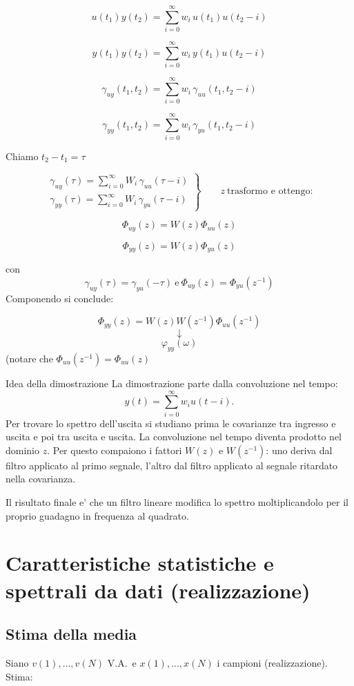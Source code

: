 \documentclass[11pt,a4paper]{article}
\begin{document}
\[
u(t_1)y(t_2)=\sum_{i=0}^{\infty}w_i\,u(t_1)u(t_2-i)
\]

\[
y(t_1)y(t_2)=\sum_{i=0}^{\infty}w_i\,y(t_1)u(t_2-i)
\]

\[
\gamma_{uy}(t_1,t_2)=\sum_{i=0}^{\infty}w_i\,\gamma_{uu}(t_1,t_2-i)
\]

\[
\gamma_{yy}(t_1,t_2)=\sum_{i=0}^{\infty}w_i\,\gamma_{yu}(t_1,t_2-i)
\]

Chiamo $t_2-t_1=\tau$

\[
\left.
\begin{array}{c}
\gamma_{uy}(\tau)=\sum\limits_{i=0}^{\infty}W_i\,\gamma_{uu}(\tau-i)\\[0.4em]
\gamma_{yy}(\tau)=\sum\limits_{i=0}^{\infty}W_i\,\gamma_{yu}(\tau-i)
\end{array}
\right\}
\qquad
z\ \text{trasformo e ottengo:}
\]

\[
\Phi_{uy}(z)=W(z)\Phi_{uu}(z)
\]

\[
\Phi_{yy}(z)=W(z)\Phi_{yu}(z)
\]

con \[
\boxed{\gamma_{uy}(\tau)=\gamma_{yu}(-\tau)
 \ \text{e} \
\Phi_{uy}(z)=\Phi_{yu}(z^{-1})}
\] Componendo si conclude:

\[
\Phi_{yy}(z)=W(z)W(z^{-1})\Phi_{uu}(z^{-1})
\]
\[
\downarrow
\]
\[
\varphi_{yy}(\omega)
\]
(notare che $\Phi_{uu}(z^{-1}) = \Phi_{uu}(z)$ 

\begin{spiegazione}{Idea della dimostrazione}
La dimostrazione parte dalla convoluzione nel tempo:
\[
y(t)=\sum_{i=0}^{\infty}w_i u(t-i).
\]
Per trovare lo spettro dell'uscita si studiano prima le covarianze tra ingresso e uscita e poi tra uscita e uscita. La convoluzione nel tempo diventa prodotto nel dominio $z$. Per questo compaiono i fattori $W(z)$ e $W(z^{-1})$: uno deriva dal filtro applicato al primo segnale, l'altro dal filtro applicato al segnale ritardato nella covarianza.

Il risultato finale e' che un filtro lineare modifica lo spettro moltiplicandolo per il proprio guadagno in frequenza al quadrato.
\end{spiegazione}


\section{Caratteristiche statistiche e spettrali da dati (realizzazione)}

\subsection{Stima della media}
Siano $v(1),\dots,v(N)$ V.A.\ e $x(1),\dots,x(N)$ i campioni (realizzazione). 
Stima:
\end{document}
